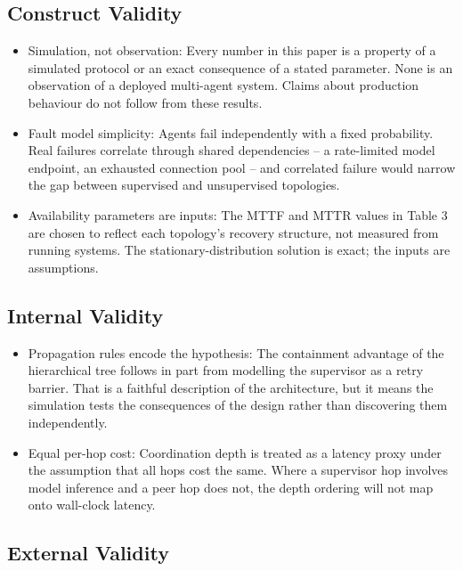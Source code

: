 \documentclass{article}
\begin{document}
\subsection{Construct Validity}

\begin{itemize}
  \item Simulation, not observation: Every number in this paper is a property of a simulated protocol or an exact consequence of a stated parameter. None is an observation of a deployed multi-agent system. Claims about production behaviour do not follow from these results.
  \item Fault model simplicity: Agents fail independently with a fixed probability. Real failures correlate through shared dependencies -- a rate-limited model endpoint, an exhausted connection pool -- and correlated failure would narrow the gap between supervised and unsupervised topologies.
  \item Availability parameters are inputs: The MTTF and MTTR values in Table 3 are chosen to reflect each topology's recovery structure, not measured from running systems. The stationary-distribution solution is exact; the inputs are assumptions.
\end{itemize}


\subsection{Internal Validity}

\begin{itemize}
  \item Propagation rules encode the hypothesis: The containment advantage of the hierarchical tree follows in part from modelling the supervisor as a retry barrier. That is a faithful description of the architecture, but it means the simulation tests the consequences of the design rather than discovering them independently.
  \item Equal per-hop cost: Coordination depth is treated as a latency proxy under the assumption that all hops cost the same. Where a supervisor hop involves model inference and a peer hop does not, the depth ordering will not map onto wall-clock latency.
\end{itemize}


\subsection{External Validity}
\end{document}
